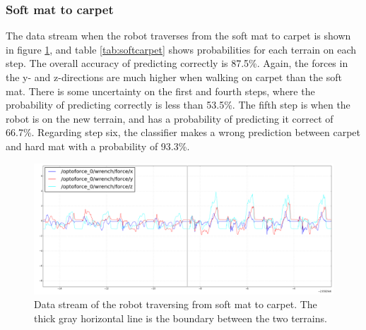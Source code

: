 \documentclass[USenglish]{ifimaster}  %
\begin{document}
\subsubsection{Soft mat to carpet}
The data stream when the robot traverses from the soft mat to carpet is shown in figure \ref{fig:softcarpet}, and table \ref{tab:softcarpet} shows probabilities for each terrain on each step. The overall accuracy of predicting correctly is 87.5\%. Again, the forces in the y- and z-directions are much higher when walking on carpet than the soft mat. There is some uncertainty on the first and fourth steps, where the probability of predicting correctly is less than 53.5\%. The fifth step is when the robot is on the new terrain, and has a probability of predicting it correct of 66.7\%. Regarding step six, the classifier makes a wrong prediction between carpet and hard mat with a probability of 93.3\%.
	
	
	\begin{figure}[h]
		\centering
		\includegraphics[width=\textwidth,height=\textheight,keepaspectratio]{Figures/MM4Teppe2_line2}
		\caption[Data stream of the transition from soft mat to carpet.]{Data stream of the robot traversing from soft mat to carpet. The thick gray horizontal line is the boundary between the two terrains.}
		\label{fig:softcarpet}
	\end{figure}
	
\end{document}

